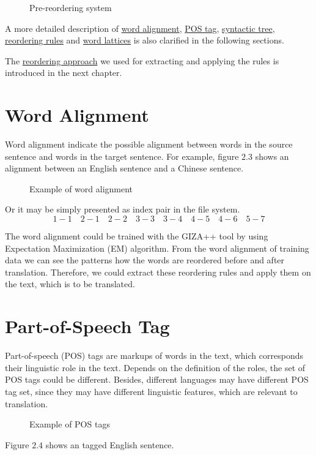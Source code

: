 \begin{figure}[H]
\centering

\caption{Pre-reordering system}
\end{figure}

A more detailed description of \hyperref[ch:Foundations:sec:Alignment]{word alignment}, \hyperref[ch:Foundations:sec:PosTag]{POS tag}, \hyperref[ch:Foundations:sec:SyntacticTree]{syntactic tree},
\hyperref[ch:Foundations:sec:types]{reordering rules} and 
\hyperref[ch:Foundations:sec:Lattices]{word lattices} is also clarified in the following sections.

The \hyperref[ch:ReorderingApproach]{reordering approach} we used for extracting and applying the rules is introduced in the next chapter.

\section{Word Alignment}
\label{ch:Foundations:sec:Alignment}

Word alignment indicate the possible alignment between words in the source sentence and words in the target sentence. For example, figure $2.3$ shows an alignment between an English sentence and a Chinese sentence.

\begin{figure}[H]
\centering

\caption{Example of word alignment}
\end{figure}
Or it may be simply presented as index pair in the file system.
$$1-1\quad 2-1\quad 2-2\quad 3-3\quad 3-4\quad 4-5\quad 4-6\quad 5-7$$

The word alignment could be trained with the GIZA++ tool by using Expectation Maximization (EM) algorithm. From the word alignment of training data we can see the patterns how the words are reordered before and after translation. Therefore, we could extract these reordering rules and apply them on the text, which is to be translated.

\section{Part-of-Speech Tag}

Part-of-speech (POS) tags are markups of words in the text, which corresponds their linguistic role in the text. Depends on the definition of the roles, the set of POS tags could be different. Besides, different languages may have different POS tag set, since they may have different linguistic features, which are relevant to translation.
\begin{figure}[H]
\centering

\caption{Example of POS tags}
\end{figure}
Figure $2.4$ shows an tagged English sentence. 

